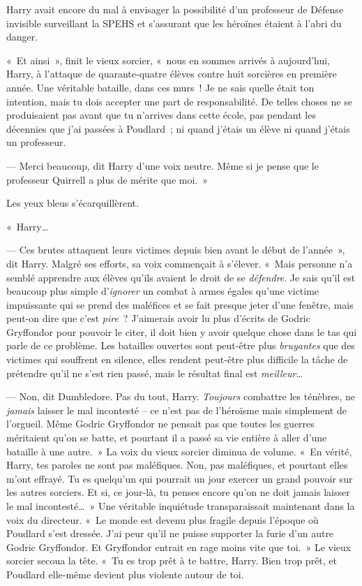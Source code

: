 Harry avait encore du mal à envisager la possibilité d'un professeur de Défense invisible surveillant la SPEHS et s'assurant que les héroïnes étaient à l'abri du danger.

«~Et ainsi~», finit le vieux sorcier, «~nous en sommes arrivés à aujourd'hui, Harry, à l'attaque de quarante-quatre élèves contre huit sorcières en première année. Une véritable bataille, dans ces murs~! Je ne sais quelle était ton intention, mais tu dois accepter une part de responsabilité. De telles choses ne se produisaient pas avant que tu n'arrives dans cette école, pas pendant les décennies que j'ai passées à Poudlard~; ni quand j'étais un élève ni quand j'étais un professeur.

--- Merci beaucoup, dit Harry d'une voix neutre. Même si je pense que le professeur Quirrell a plus de mérite que moi.~»

Les yeux bleus s'écarquillèrent.

«~Harry…

--- Ces brutes attaquent leurs victimes depuis bien avant le début de l'année~», dit Harry. Malgré ses efforts, sa voix commençait à s'élever. «~Mais personne n'a semblé apprendre aux élèves qu'ils avaient le droit de se \emph{défendre}. Je sais qu'il est beaucoup plus simple d'\emph{ignorer} un combat à armes égales qu'une victime impuissante qui se prend des maléfices et se fait presque jeter d'une fenêtre, mais peut-on dire que c'est \emph{pire}~? J'aimerais avoir lu plus d'écrits de Godric Gryffondor pour pouvoir le citer, il doit bien y avoir quelque chose dans le tas qui parle de ce problème. Les batailles ouvertes sont peut-être plus \emph{bruyantes} que des victimes qui souffrent en silence, elles rendent peut-être plus difficile la tâche de prétendre qu'il ne s'est rien passé, mais le résultat final est \emph{meilleur}…

--- Non, dit Dumbledore. Pas du tout, Harry. \emph{Toujours} combattre les ténèbres, ne \emph{jamais} laisser le mal incontesté -- ce n'est pas de l'héroïsme mais simplement de l'orgueil. Même Godric Gryffondor ne pensait pas que toutes les guerres méritaient qu'on se batte, et pourtant il a passé sa vie entière à aller d'une bataille à une autre.~» La voix du vieux sorcier diminua de volume. «~En vérité, Harry, tes paroles ne sont pas maléfiques. Non, pas maléfiques, et pourtant elles m'ont effrayé. Tu es quelqu'un qui pourrait un jour exercer un grand pouvoir sur les autres sorciers. Et si, ce jour-là, tu penses encore qu'on ne doit jamais laisser le mal incontesté…~» Une véritable inquiétude transparaissait maintenant dans la voix du directeur. «~Le monde est devenu plus fragile depuis l'époque où Poudlard s'est dressée. J'ai peur qu'il ne puisse supporter la furie d'un autre Godric Gryffondor. Et Gryffondor entrait en rage moins vite que toi.~» Le vieux sorcier secoua la tête. «~Tu es trop prêt à te battre, Harry. Bien trop prêt, et Poudlard elle-même devient plus violente autour de toi.

